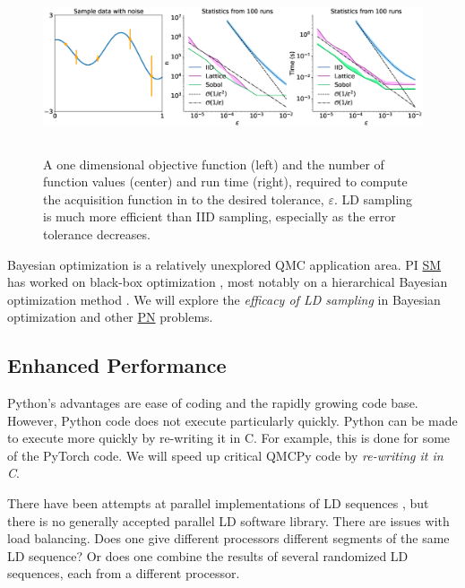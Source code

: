 \documentclass[11pt]{NSFamsart}
\newcommand{\SM}{\hyperlink{SMlink}{SM}\xspace}
\newcommand{\PN}{\hyperlink{PNlink}{PN}\xspace}
\begin{document}
\begin{figure}[h]
	\centering
	\includegraphics[height = 5cm]{ProgramsImages/qEI_cost_comp_time.eps}
	\caption{A one dimensional objective function (left) and the number of function values (center) and run time (right), required to compute the acquisition function in \cite[qEI with QMCPy]{QMCBlog} to the desired tolerance, $\varepsilon$.  LD sampling is much more efficient than IID sampling, especially as the error tolerance decreases.}
	\label{fig:qei}
\end{figure}

Bayesian optimization is a relatively unexplored QMC application area. PI \SM has worked on black-box optimization \cite{mak2019analysis,chen2019hierarchical}, most notably on a hierarchical Bayesian optimization method \cite{chen2019hierarchical}. We will explore the \emph{efficacy of LD sampling} in Bayesian optimization and other \PN problems.



\subsection{Enhanced Performance}
Python's advantages are ease of coding and the rapidly growing code base.  However, Python code does not execute particularly quickly.  Python can be made to execute more quickly by re-writing it in C.  For example, this is done for some of the PyTorch code.  We will speed up critical QMCPy code by \emph{re-writing it in C}.

There have been attempts at parallel implementations of LD sequences \cite{LiMul00a,OktSri02, SchUhl01,WanEtal06a,LiuHic04a}, but there is no generally accepted parallel LD software library.  There are issues with load balancing.  Does one give different processors different segments of the same LD sequence?  Or does one combine the results of several randomized LD sequences, each from a different processor.
\end{document}

